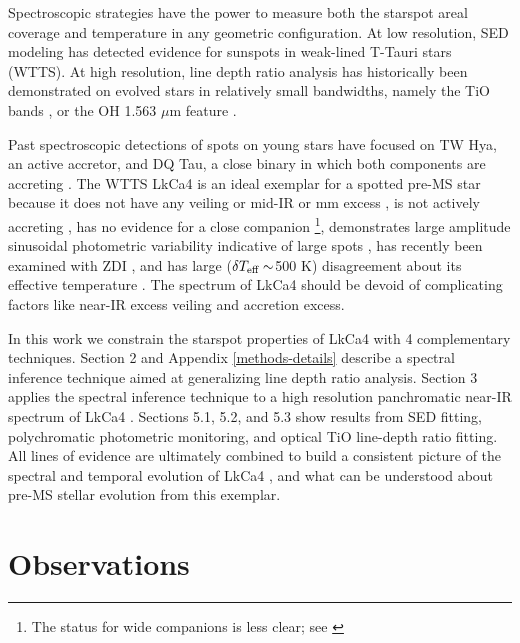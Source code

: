 \documentclass[twocolumn]{emulateapj}%
\newcommand{\name}{LkCa4 }
\begin{document}
Spectroscopic strategies have the power to measure both the starspot areal coverage and temperature in any geometric configuration.  At low resolution, SED modeling \citep{wolk96} has detected evidence for sunspots in weak-lined T-Tauri stars (WTTS).  At high resolution, line depth ratio analysis has historically been demonstrated on evolved stars in relatively small bandwidths, namely the TiO bands \citep{neff95,oneal96,oneal98,oneal04}, or the OH 1.563 $\mu$m feature \citep{oneal01}. 


Past spectroscopic detections of spots on young stars have focused on TW Hya, an active accretor, and DQ Tau, a close binary in which both components are accreting \citep{debes13,bary14}.  The WTTS \name \citep{herbig86,strom89a,downes88,strom89b} is an ideal exemplar for a spotted pre-MS star because it does not have any veiling \citep{hartigan95} or mid-IR or mm excess \citep{skrutskie90,andrews05,mccabe06,furlan06,luhman10,furlan11,harris12,marichalar12,howard13,buckle15}, is not actively accreting \citep{hartigan95,kenyon98,edwards06,cauley12,yang12,ardila13,castro13,loyd14,martinez15}, has no evidence for a close companion \citep{karr10,kraus11,daemgen15}\footnote{The status for wide companions is less clear; see \citet{stauffer91,itoh08,kraus09,kraus11}}, demonstrates large amplitude sinusoidal photometric variability indicative of large spots \citep{grankin08,xiao12}, has recently been examined with ZDI \citep{donati14}, and has large ($\delta T_\textrm{eff} \sim$500 K) disagreement about its effective temperature \citep{herczeg14}.  The spectrum of \name should be devoid of complicating factors like near-IR excess veiling and accretion excess.

In this work we constrain the starspot properties of \name with 4 complementary techniques.  Section 2 and Appendix \ref{methods-details} describe a spectral inference technique aimed at generalizing line depth ratio analysis.  Section 3 applies the spectral inference technique to a high resolution panchromatic near-IR spectrum of \name.  Sections 5.1, 5.2, and 5.3 show results from SED fitting, polychromatic photometric monitoring, and optical TiO line-depth ratio fitting.  All lines of evidence are ultimately combined to build a consistent picture of the spectral and temporal evolution of \name, and what can be understood about pre-MS stellar evolution from this exemplar.


\section{Observations}\label{sec:obs} 
\end{document}
